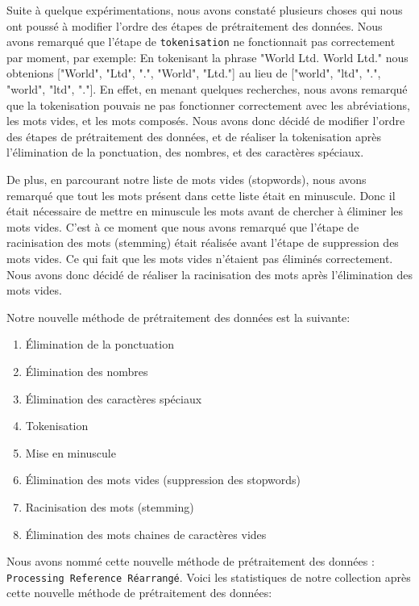 \documentclass[a4paper, 12pt]{article}
\begin{document}
Suite à quelque expérimentations, nous avons constaté plusieurs choses qui nous ont poussé à modifier l'ordre des étapes de prétraitement des données.
Nous avons remarqué que l'étape de \texttt{tokenisation} ne fonctionnait pas correctement par moment, par exemple:
En tokenisant la phrase "World Ltd. World Ltd." nous obtenions ["World", "Ltd", ".", "World", "Ltd."] au lieu de ["world", "ltd", ".", "world", "ltd", "."]. 
En effet, en menant quelques recherches, nous avons remarqué que la tokenisation pouvais ne pas fonctionner correctement avec les abréviations, les mots vides, et les mots composés.
Nous avons donc décidé de modifier l'ordre des étapes de prétraitement des données, et de réaliser la tokenisation après l'élimination de la ponctuation, des nombres, et des caractères spéciaux.

De plus, en parcourant notre liste de mots vides (stopwords), nous avons remarqué que tout les mots présent dans 
cette liste était en minuscule. Donc il était nécessaire de mettre en minuscule les mots avant de chercher à
éliminer les mots vides. C'est à ce moment que nous avons remarqué que l'étape de racinisation des mots (stemming)
était réalisée avant l'étape de suppression des mots vides. Ce qui fait que les mots vides n'étaient pas éliminés
correctement. Nous avons donc décidé de réaliser la racinisation des mots après l'élimination des mots vides.

Notre nouvelle méthode de prétraitement des données est la suivante:
\begin{enumerate}
  \item Élimination de la ponctuation
  \item Élimination des nombres
  \item Élimination des caractères spéciaux
  \item Tokenisation
  \item Mise en minuscule
  \item Élimination des mots vides (suppression des stopwords)
  \item Racinisation des mots (stemming)
  \item Élimination des mots chaines de caractères vides  
\end{enumerate}

Nous avons nommé cette nouvelle méthode de prétraitement des données : \texttt{Processing Reference Réarrangé}.
Voici les statistiques de notre collection après cette nouvelle méthode de prétraitement des données:
\end{document}
